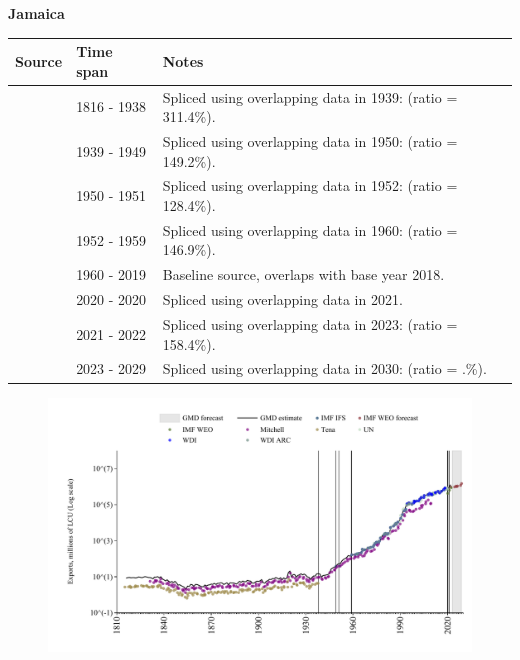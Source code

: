 \documentclass[12pt,a4paper,landscape]{article}
\begin{document}
\begin{adjustbox}{max totalsize={\paperwidth}{\paperheight},center}
\begin{minipage}[t][\textheight][t]{\textwidth}
\vspace*{0.5cm}
{}
\begin{center}
{\Large\bfseries Jamaica}
\end{center}
\vspace{0.5cm}
\begin{table}[H]
\centering
\small
\begin{tabular}{|l|l|l|}
\hline
\textbf{Source} & \textbf{Time span} & \textbf{Notes} \\
\hline
\rowcolor{white}\cite{Tena}& 1816 - 1938 &Spliced using overlapping data in 1939: (ratio = 311.4\%).\\
\rowcolor{lightgray}\cite{Mitchell}& 1939 - 1949 &Spliced using overlapping data in 1950: (ratio = 149.2\%).\\
\rowcolor{white}\cite{IMF_IFS}& 1950 - 1951 &Spliced using overlapping data in 1952: (ratio = 128.4\%).\\
\rowcolor{lightgray}\cite{Mitchell}& 1952 - 1959 &Spliced using overlapping data in 1960: (ratio = 146.9\%).\\
\rowcolor{white}\cite{WDI}& 1960 - 2019 &Baseline source, overlaps with base year 2018.\\
\rowcolor{lightgray}\cite{UN}& 2020 - 2020 &Spliced using overlapping data in 2021.\\
\rowcolor{white}\cite{IMF_WEO}& 2021 - 2022 &Spliced using overlapping data in 2023: (ratio = 158.4\%).\\
\rowcolor{lightgray}\cite{IMF_WEO_forecast}& 2023 - 2029 &Spliced using overlapping data in 2030: (ratio = .\%).\\
\hline
\end{tabular}
\end{table}
\begin{figure}[H]
\centering
\includegraphics[width=\textwidth,height=0.6\textheight,keepaspectratio]{graphs/JAM_exports.pdf}
\end{figure}
\end{minipage}
\end{adjustbox}
\end{document}
